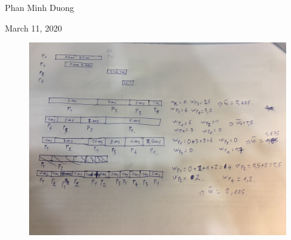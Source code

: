 \documentclass[article, paper=a4, fontsize=11pt]{scrartcl}
\begin{document}
\begin{center}
Phan Minh Duong
\end{center}
\begin{center}
March 11, 2020
\end{center}

\begin{figure}[h!]
 \centering
  \includegraphics[width=\linewidth]{exercise2.JPG}
  \label{fig:boat1}
 
\end{figure}
\end{document}

